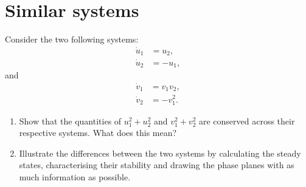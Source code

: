 \documentclass[]{article}
\begin{document}
\section{Similar systems}
Consider the two following systems:
\begin{align}
\dot{u}_1&=u_2,\\
\dot{u}_2&=-u_1,
\end{align}
and
\begin{align}
\dot{v}_1&=v_1v_2,\\
\dot{v}_2&=-v_1^2.\label{v2}
\end{align}
\begin{enumerate}
\item Show that the quantities of $u_1^2+u_2^2$ and $v_1^2+v_2^2$ are conserved across their respective systems. What does this mean?
\item Illustrate the differences between the two systems by calculating the steady states, characterising their stability and drawing the phase planes with as much information as possible.
\end{enumerate}
\end{document}
